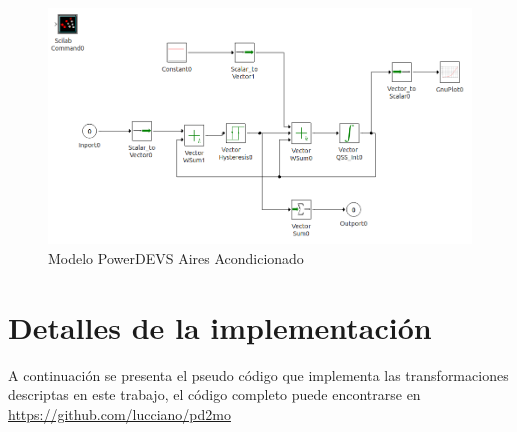 \documentclass[a4paper,	11pt]{report}
\begin{document}
\begin{figure}[!htbp]
  \includegraphics[scale=0.40]{Airs}
  \caption{Modelo PowerDEVS Aires Acondicionado }
   \label{fig:airs}
\end{figure}

\chapter{Detalles de la implementación}
A continuación se presenta el pseudo código que implementa las transformaciones descriptas en este trabajo, el código completo puede encontrarse en \url{https://github.com/lucciano/pd2mo}
\end{document}
